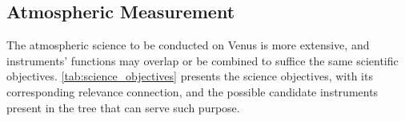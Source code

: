 



\subsection{Atmospheric Measurement}

The atmospheric science to be conducted on Venus is more extensive, and instruments' functions may overlap or be combined to suffice the same scientific objectives. \autoref{tab:science_objectives} presents the science objectives, with its corresponding relevance connection, and the possible candidate instruments present in the tree that can serve such purpose. 

